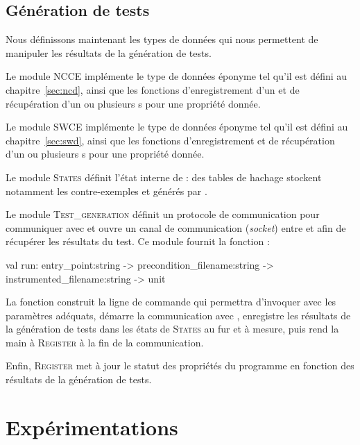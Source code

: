 \subsection{Génération de tests}


Nous définissons maintenant les types de données qui nous permettent de
manipuler les résultats de la génération de tests.

Le module \textsc{NCCE} implémente le type de données éponyme tel qu'il est
défini au chapitre~\ref{sec:ncd}, ainsi que les fonctions d'enregistrement d'un
\NCCE et de récupération d'un ou plusieurs \NCCE{}s pour une propriété donnée.

Le module \textsc{SWCE} implémente le type de données éponyme tel qu'il est
défini au chapitre~\ref{sec:swd}, ainsi que les fonctions d'enregistrement et de
récupération d'un ou plusieurs \SWCE{}s pour une propriété donnée.

Le module \textsc{States} définit l'état interne de \stady : des tables
de hachage stockent notamment les contre-exemples \NCCE et \SWCE générés par
\pathcrawler.

Le module \textsc{Test\_generation} définit un protocole de communication pour
communiquer avec \pathcrawler et ouvre un canal de communication ({\em socket})
entre \stady et \pathcrawler afin de récupérer les résultats du test.
Ce module fournit la fonction  :

\begin{ocamlcode}
val run: entry_point:string ->
  precondition_filename:string ->
  instrumented_filename:string ->
  unit
\end{ocamlcode}

La fonction  construit la ligne de commande qui permettra
d'invoquer \pathcrawler avec les paramètres adéquats, démarre la communication
avec \pathcrawler, enregistre les résultats de la génération de tests dans les
états de \textsc{States} au fur et à mesure, puis rend la main à
\textsc{Register} à la fin de la communication.

Enfin, \textsc{Register} met à jour le statut des propriétés du programme en
fonction des résultats de la génération de tests.


\section{Expérimentations}
\label{sec:stady-exp}


